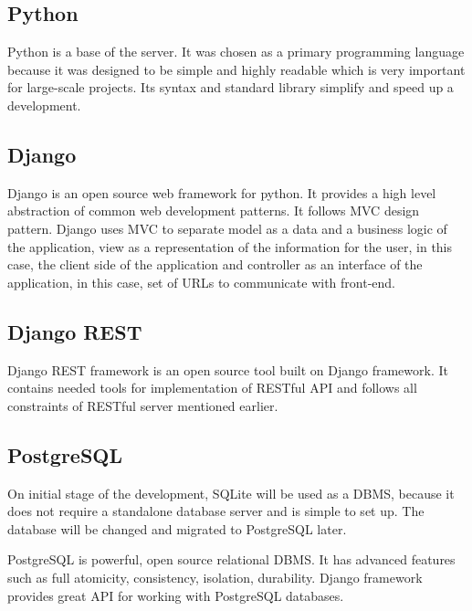 \subsection{Python}
Python is a base of the server. It was chosen as a primary programming language because it was designed to be simple
and highly readable which is very important for large-scale projects. Its syntax and standard library simplify and
speed up a development.

\subsection{Django}
Django is an open source web framework for python. It provides a high level abstraction of common web development
patterns. It follows \ac{MVC} design pattern. Django uses \ac{MVC} to separate model as a data and a business logic of
the application, view as a representation of the information for the user, in this case, the client side of the
application and controller as an interface of the application, in this case, set of URLs to communicate with front-end.

\subsection{Django REST}
Django REST framework is an open source tool built on Django framework. It contains needed tools for implementation of
\ac{REST}ful \ac{API} and follows all constraints of \ac{REST}ful server mentioned earlier.


\subsection{PostgreSQL}
On initial stage of the development, SQLite will be used as a \ac{DBMS}, because it does not require a standalone
database server and is simple to set up. The database will be changed and migrated to PostgreSQL later.\par
PostgreSQL\cite{postgres} is powerful, open source relational \ac{DBMS}. It has advanced features such as full
atomicity, consistency, isolation, durability. Django framework provides great \ac{API} for working with PostgreSQL
databases.


